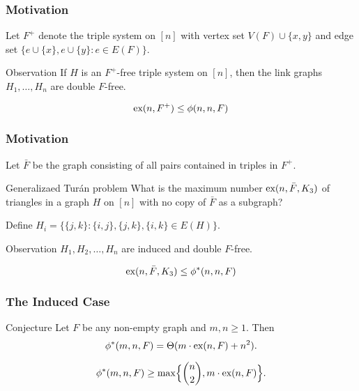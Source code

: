 \documentclass{beamer}
\newcommand*{\ex}{\textnormal{ex}}
\begin{document}
\begin{frame}

  \frametitle{Motivation}

  Let $F^+$ denote the triple system on $[n]$ with vertex set $V(F) \cup \{x, y\}$ and edge set $\{e \cup \{x\}, e \cup \{y\} : e \in E(F)\}$.

  \pause

  \vspace{0.5cm}

  \begin{block}{Observation}
    If $H$ is an $F^+$-free triple system on $[n]$, then the link graphs $H_1, \ldots, H_n$ are double $F$-free.
  \end{block}

  \pause

  \vspace{0.5cm}

  \[
    \ex(n, F^+) \leq \phi(n, n, F)
  \]
\end{frame}

\begin{frame}

  \frametitle{Motivation}

  Let $\bar{F}$ be the graph consisting of all pairs contained in triples in $F^+$. 

  \begin{block}{Generalizaed Turán problem}
    What is the maximum number $\ex(n, \bar{F}, K_3)$ of triangles in a graph $H$ on $[n]$ with no copy of $\bar{F}$ as a subgraph?
  \end{block}

  \pause

  \vspace{0.3cm}

  Define $H_i = \{\{j, k\} : \{i, j\}, \{j, k\}, \{i, k\} \in E(H)\}$.

  \pause

  \begin{block}{Observation}
    $H_1, H_2, \ldots, H_n$ are induced and double $F$-free.
  \end{block}

  \pause

  \vspace{0.3cm}

  \[
    \ex(n, \bar{F}, K_3) \leq \phi^*(n, n, F)
  \]
\end{frame}

\begin{frame}
  \frametitle{The Induced Case}

  \begin{block}{Conjecture}
    Let $F$ be any non-empty graph and $m, n \geq 1$. Then
    \[ 
      \phi^*(m,n,F) = \Theta(m \cdot \ex(n,F) + n^2).
    \]
  \end{block}

  \pause

  \vspace{0.3cm}

  \[ 
    \phi^*(m,n,F) \geq \max\Bigl\{\binom{n}{2},m\cdot \ex(n,F)\Bigr\}.
  \]
\end{frame}
\end{document}
